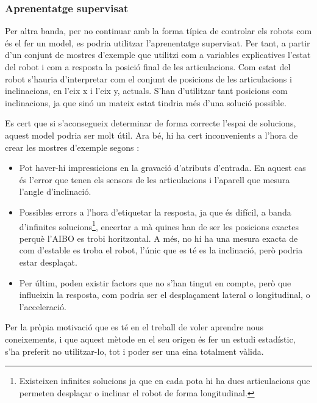 \documentclass[12pt,a4paper,final,twoside]{article}
\begin{document}
\subsubsection{Aprenentatge supervisat}

Per altra banda, per no continuar amb la forma típica de controlar els robots com és el fer un model, es podria utilitzar l'aprenentatge supervisat. Per tant, a partir d'un conjunt de mostres d'exemple que utilitzi com a variables explicatives l'estat del robot i com a resposta la posició final de les articulacions. Com estat del robot s'hauria d'interpretar com el conjunt de posicions de les articulacions i inclinacions, en l'eix x i l'eix y, actuals. S'han d'utilitzar tant posicions com inclinacions, ja que sinó un mateix estat tindria més d'una solució possible.

Es cert que si s'aconsegueix determinar de forma correcte l'espai de solucions, aquest model podria ser molt útil. Ara bé, hi ha cert inconvenients a l'hora de crear les mostres d'exemple segons \cite{Alpaydin2004}:

\begin{itemize}

\item Pot haver-hi impressicions en la gravació d'atributs d'entrada. En aquest cas és l'error que tenen els sensors de les articulacions i l'aparell que mesura l'angle d'inclinació.

\item Possibles errors a l'hora d'etiquetar la resposta, ja que és difícil, a banda d'infinites solucions\footnote{Existeixen infinites solucions ja que en cada pota hi ha dues articulacions que permeten desplaçar o inclinar el robot de forma longitudinal.}, encertar a mà quines han de ser les posicions exactes perquè l'AIBO es trobi horitzontal. A més, no hi ha una mesura exacta de com d'estable es troba el robot, l'únic que es té es la inclinació, però podria estar desplaçat.

\item Per últim, poden existir factors que no s'han tingut en compte, però que influeixin la resposta, com podria ser el desplaçament lateral o longitudinal, o l'acceleració.
\end{itemize}

Per la pròpia motivació que es té en el treball de voler aprendre nous coneixements, i que aquest mètode en el seu origen és fer un estudi estadístic, s'ha preferit no utilitzar-lo, tot i poder ser una eina totalment vàlida.
\end{document}
